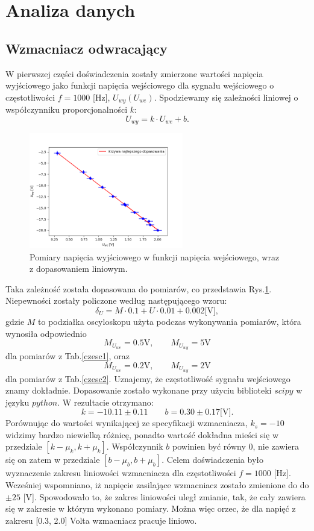 \documentclass[11pt,a4paper]{article}
\begin{document}
\section*{Analiza danych}
\subsection*{Wzmacniacz odwracający}
W pierwszej części doświadczenia zostały zmierzone wartości napięcia wyjściowego jako funkcji napięcia wejściowego dla sygnału wejściowego o częstotliwości $f=1000$ [Hz], $U_{wy} (U_{we})$. Spodziewamy się zależności liniowej o współczynniku proporcjonalności $k$:
$$ U_{wy} = k \cdot U_{we} + b. $$
 \begin{figure}[ht!]	
	\begin{center}
		\includegraphics[width = 0.6\textwidth]{Figure_1.png}
		\caption{Pomiary napięcia wyjściowego w funkcji napięcia wejściowego, wraz z dopasowaniem liniowym.}
		\label{wykres1}
	\end{center}
\end{figure}	
Taka zależność została dopasowana do pomiarów, co przedstawia Rys.\ref{wykres1}. Niepewności zostały policzone według następującego wzoru:
$$ \delta_{U} = M \cdot 0.1 + U \cdot 0.01 + 0.002 \text{[V]},$$
gdzie $M$ to podziałka oscyloskopu użyta podczas wykonywania pomiarów, która wynosiła odpowiednio
$$ M_{U_{we}} = 0.5 \text{V}, \qquad M_{U_{wy}} = 5 \text{V} $$
dla pomiarów z Tab.\ref{czesc1}, oraz 
$$ M_{U_{we}} = 0.2 \text{V}, \qquad M_{U_{wy}} = 2 \text{V} $$
dla pomiarów z Tab.\ref{czesc2}. Uznajemy, że częstotliwość sygnału wejściowego znamy dokładnie.
Dopasowanie zostało wykonane przy użyciu biblioteki $scipy$ w języku $python$. W rezultacie otrzymano:
$$ k = -10.11 \pm 0.11 \qquad b = 0.30 \pm 0.17 \text{[V]}. $$
Porównując do wartości wynikającej ze specyfikacji wzmacniacza, $k_s = -10$ widzimy bardzo niewielką różnicę, ponadto wartość dokładna mieści się w przedziale $[k - \mu_k, k + \mu_k]$. Współczynnik $b$ powinien być równy 0, nie zawiera się on zatem w przedziale $[b - \mu_b, b + \mu_b]$. Celem doświadczenia było wyznaczenie zakresu liniowości wzmacniacza dla częstotliwości $f = 1000$ [Hz]. Wcześniej wspomniano, iż napięcie zasilające wzmacniacz zostało zmienione do do $\pm 25$ [V]. Spowodowało to, że zakres liniowości uległ zmianie, tak, że cały zawiera się w zakresie w którym wykonano pomiary. Można więc orzec, że dla napięć z zakresu [0.3, 2.0] Volta wzmacniacz pracuje liniowo. \\ \\
\end{document}
